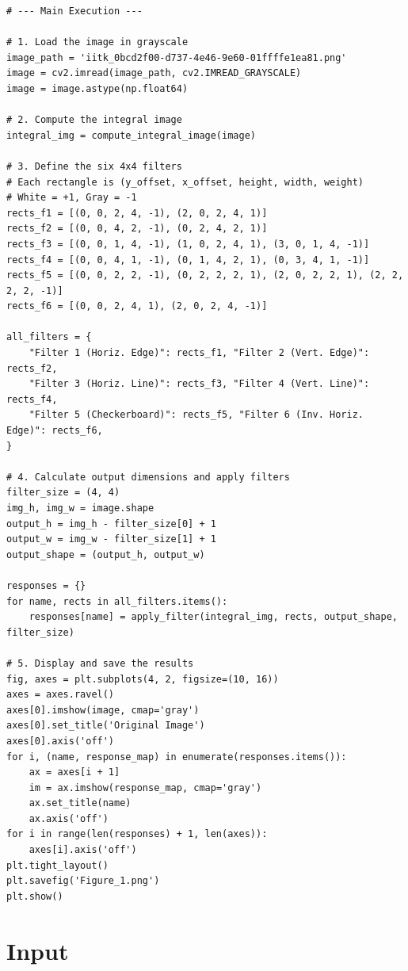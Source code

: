 \documentclass[12pt]{article}
\begin{document}
\begin{lstlisting}[caption={Python code for computing filter responses using the integral image.}, label={lst:code}]
# --- Main Execution ---

# 1. Load the image in grayscale
image_path = 'iitk_0bcd2f00-d737-4e46-9e60-01ffffe1ea81.png'
image = cv2.imread(image_path, cv2.IMREAD_GRAYSCALE)
image = image.astype(np.float64)

# 2. Compute the integral image
integral_img = compute_integral_image(image)

# 3. Define the six 4x4 filters
# Each rectangle is (y_offset, x_offset, height, width, weight)
# White = +1, Gray = -1
rects_f1 = [(0, 0, 2, 4, -1), (2, 0, 2, 4, 1)]
rects_f2 = [(0, 0, 4, 2, -1), (0, 2, 4, 2, 1)]
rects_f3 = [(0, 0, 1, 4, -1), (1, 0, 2, 4, 1), (3, 0, 1, 4, -1)]
rects_f4 = [(0, 0, 4, 1, -1), (0, 1, 4, 2, 1), (0, 3, 4, 1, -1)]
rects_f5 = [(0, 0, 2, 2, -1), (0, 2, 2, 2, 1), (2, 0, 2, 2, 1), (2, 2, 2, 2, -1)]
rects_f6 = [(0, 0, 2, 4, 1), (2, 0, 2, 4, -1)]

all_filters = {
    "Filter 1 (Horiz. Edge)": rects_f1, "Filter 2 (Vert. Edge)": rects_f2,
    "Filter 3 (Horiz. Line)": rects_f3, "Filter 4 (Vert. Line)": rects_f4,
    "Filter 5 (Checkerboard)": rects_f5, "Filter 6 (Inv. Horiz. Edge)": rects_f6,
}

# 4. Calculate output dimensions and apply filters
filter_size = (4, 4)
img_h, img_w = image.shape
output_h = img_h - filter_size[0] + 1
output_w = img_w - filter_size[1] + 1
output_shape = (output_h, output_w)

responses = {}
for name, rects in all_filters.items():
    responses[name] = apply_filter(integral_img, rects, output_shape, filter_size)

# 5. Display and save the results
fig, axes = plt.subplots(4, 2, figsize=(10, 16))
axes = axes.ravel()
axes[0].imshow(image, cmap='gray')
axes[0].set_title('Original Image')
axes[0].axis('off')
for i, (name, response_map) in enumerate(responses.items()):
    ax = axes[i + 1]
    im = ax.imshow(response_map, cmap='gray')
    ax.set_title(name)
    ax.axis('off')
for i in range(len(responses) + 1, len(axes)):
    axes[i].axis('off')
plt.tight_layout()
plt.savefig('Figure_1.png')
plt.show()
\end{lstlisting}

\section{Input}
\end{document}
